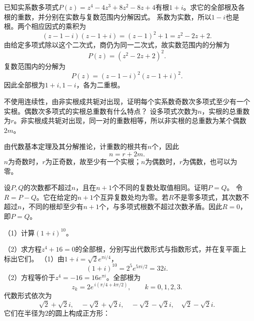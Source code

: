 已知实系数多项式\(P(z)=z^4-4z^3+8z^2-8z+4\)有根\(1+i\)。求它的全部根及各根的重数，并分别在实数与复数范围内分解因式。
\solutionanswer
系数为实数，所以\(1-i\)也是根。两个相应因式的乘积为
\[
(z-1-i)(z-1+i)=(z-1)^2+1=z^2-2z+2.
\]
由给定多项式除以这个二次式，商仍为同一二次式，故实数范围内的分解为
\[
P(z)=(z^2-2z+2)^2.
\]
复数范围内的分解为
\[
P(z)=(z-1-i)^2(z-1+i)^2.
\]
因此全部根为\(1+i,1-i\)，各为二重根。


不使用连续性，由非实根成共轭对出现，证明每个实系数奇数次多项式至少有一个实根。偶数次多项式的实根总重数有什么特点？
\solutionanswer
设多项式次数为\(n\)，实根的总重数为\(r\)。非实根成共轭对出现，同一对的重数相等，所以非实根的总重数为某个偶数\(2m\)。

由代数基本定理及其分解推论，计重数的根共有\(n\)个，因此
\[
n=r+2m.
\]
\(n\)为奇数时，\(r\)为正奇数，故至少有一个实根；\(n\)为偶数时，\(r\)为偶数，也可以为零。


设\(P,Q\)的次数都不超过\(n\)，且在\(n+1\)个不同的复数处取值相同。证明\(P=Q\)。
\solutionanswer
令\(R=P-Q\)。它在给定的\(n+1\)个互异复数处均为零。若\(R\)不是零多项式，其次数不超过\(n\)，不同的根却至少有\(n+1\)个，与多项式根数不超过次数矛盾。因此\(R=0\)，即\(P=Q\)。


（1）计算\(\left( 1 + i \right)^{10}\)。


（2）求方程\(z^{4} + 16 = 0\)的全部根，分别写出代数形式与指数形式，并在复平面上标出它们。
\solutionanswer
（1）由\(1+i=\sqrt2e^{\pi i/4}\)，
\[
(1+i)^{10}=2^5e^{5\pi i/2}=32i.
\]
（2）方程等价于\(z^4=-16=16e^{\pi i}\)。全部根为
\[
z_k=2e^{\,i(\pi/4+k\pi/2)},\qquad k=0,1,2,3.
\]
代数形式依次为
\[
\sqrt2+\sqrt2i,\quad-\sqrt2+\sqrt2i,\quad
-\sqrt2-\sqrt2i,\quad\sqrt2-\sqrt2i.
\]
它们在半径为\(2\)的圆上构成正方形：
\begin{center}
\end{center}


